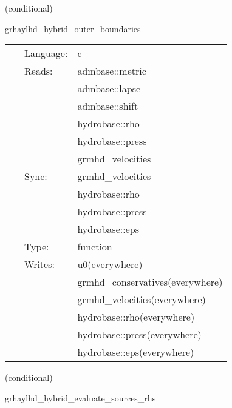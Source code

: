 \vspace{5mm}

   (conditional) 

\hspace{5mm} grhaylhd\_hybrid\_outer\_boundaries 

\hspace{5mm}{\it hybrid version of grhaylhd\_outer\_boundaries } 


\hspace{5mm}

 \begin{tabular*}{160mm}{cll} 
~ & Language:  & c \\ 
~ & Reads:  & admbase::metric \\ 
~& ~ &admbase::lapse\\ 
~& ~ &admbase::shift\\ 
~& ~ &hydrobase::rho\\ 
~& ~ &hydrobase::press\\ 
~& ~ &grmhd\_velocities\\ 
~ & Sync:  & grmhd\_velocities \\ 
~& ~ &hydrobase::rho\\ 
~& ~ &hydrobase::press\\ 
~& ~ &hydrobase::eps\\ 
~ & Type:  & function \\ 
~ & Writes:  & u0(everywhere) \\ 
~& ~ &grmhd\_conservatives(everywhere)\\ 
~& ~ &grmhd\_velocities(everywhere)\\ 
~& ~ &hydrobase::rho(everywhere)\\ 
~& ~ &hydrobase::press(everywhere)\\ 
~& ~ &hydrobase::eps(everywhere)\\ 
\end{tabular*} 


\vspace{5mm}

   (conditional) 

\hspace{5mm} grhaylhd\_hybrid\_evaluate\_sources\_rhs 

\hspace{5mm}{\it hybrid version of grhaylhd\_evaluate\_sources\_rhs } 


\hspace{5mm}

